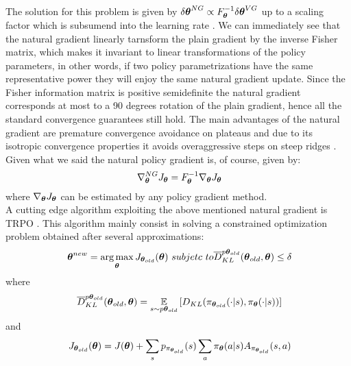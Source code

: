 The solution for this problem is given by $\delta\boldsymbol{\theta}^{NG}\propto F^{-1}_{\boldsymbol{\theta}}\delta\boldsymbol{\theta}^{VG}$ up to a scaling factor which is subsumend into the learning rate \citep{deisenroth2013survey}. We can immediately see that the natural gradient linearly tarnsform the plain gradient by the inverse Fisher matrix, which makes it invariant to linear transformations of the policy parameters, in other words, if two policy parametrizations have the same representative power they will enjoy the same natural gradient update. Since the Fisher information matrix is positive semidefinite the natural gradient corresponds at most to a 90 degrees rotation of the plain gradient, hence all the standard convergence guarantees still hold. The main advantages of the natural gradient are premature convergence avoidance on plateaus and due to its isotropic convergence properties it avoids overaggressive steps on steep ridges \citep{deisenroth2013survey}. Given what we said the natural policy gradient is, of course, given by:
\[
\ \nabla_{\boldsymbol{\theta}}^{NG} J_{\boldsymbol{\theta}}=F^{-1}_{\boldsymbol{\theta}} \nabla_{\boldsymbol{\theta}} J_{\boldsymbol{\theta}}
\]
where $\nabla_{\boldsymbol{\theta}} J_{\boldsymbol{\theta}}$ can be estimated by any policy gradient method.
\\
A cutting edge algorithm exploiting the above mentioned natural gradient is \ac{TRPO} \citep{schulman2015trust}. This algorithm mainly consist in solving a constrained optimization problem obtained after several approximations:
\[
\ \vtheta^{new}=\argmax_{\vtheta}J_{\vtheta_{old}}(\vtheta)
\ subjetc~to \overline{D}_{KL}^{p\vtheta_{old}}(\vtheta_{old},\vtheta)\le\delta
\]
where \[
\ \overline{D}_{KL}^{p\vtheta_{old}}(\vtheta_{old},\vtheta)=\EVV[s \sim p\vtheta_{old}]{D_{KL}(\pi_{\vtheta_{old}}(\cdot|s),\pi_{\vtheta}(\cdot|s))}
\]
and \[
\ J_{\boldsymbol{\theta}_{old}}(\boldsymbol{\theta})= J(\boldsymbol{\theta})+\sum_{s}p_{\pi_{\boldsymbol{\theta}_{old}}}(s)\sum_{a}\pi_{\boldsymbol{\theta}}(a|s)A_{\pi_{\boldsymbol{\theta}_{old}}}(s,a)
\]
\vspace{-0.05in}
